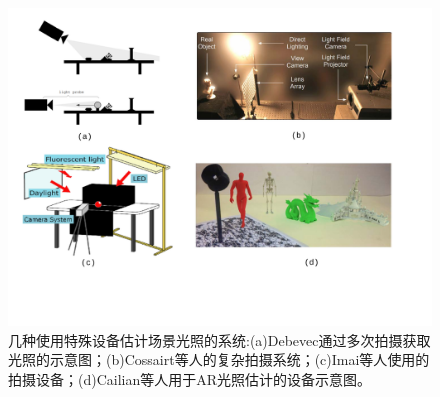 \begin{figure}[!htbp]
    \centering
    \includegraphics[width=1.0\textwidth]{Img/estimation-using-devices.pdf}

    \caption[使用特殊设备估计光照]
    {几种使用特殊设备估计场景光照的系统:(a)Debevec\cite{debevec1998rendering}通过多次拍摄获取光照的示意图；(b)Cossairt等人\cite{cossairt2008light}的复杂拍摄系统；(c)Imai等人\cite{imai2011estimation}使用的拍摄设备；(d)Cailian等人\cite{calian2013shading}用于AR光照估计的设备示意图。}
    
    \label{fig:estimation-using-devices}
\end{figure}